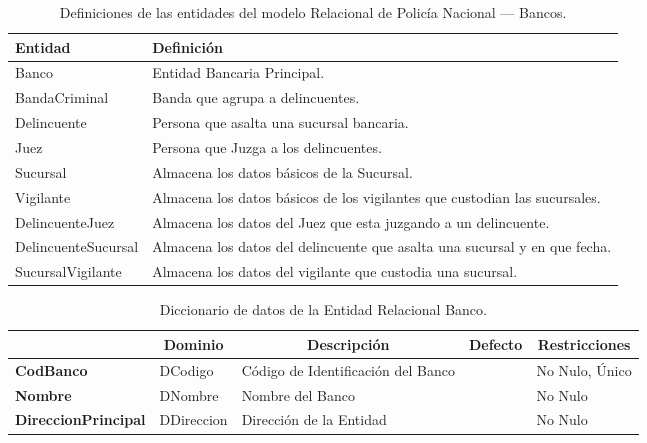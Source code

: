 \begin{table}[H]
\centering
\caption{Definiciones de las entidades del modelo Relacional de Policía Nacional --- Bancos.}
\renewcommand{\arraystretch}{1.5}%
\label{tab-DiccR-2a}
\begin{tabular}{@{}ll@{}}
\toprule
\textbf{Entidad}  & \textbf{Definición}\\ \midrule
Banco    & Entidad Bancaria Principal. \\
BandaCriminal  & Banda que agrupa a delincuentes.\\
Delincuente & Persona que asalta una sucursal bancaria.\\
Juez & Persona que Juzga a los delincuentes.\\
Sucursal & Almacena los datos básicos de la Sucursal.\\
Vigilante & Almacena los datos básicos de los vigilantes que custodian las sucursales.\\
DelincuenteJuez & Almacena los datos del Juez que esta juzgando a un delincuente.\\
DelincuenteSucursal & Almacena los datos del delincuente que asalta una sucursal y en que fecha.\\
SucursalVigilante & Almacena los datos del vigilante que custodia una sucursal.\\

\bottomrule
\end{tabular}
\end{table}

\begin{table}[H]
\centering
\caption{Diccionario de datos de la Entidad Relacional Banco.}
\label{tab-DiccR-2b}
\begin{tabular}{>{\bfseries}m{4.0cm}>{}m{3.0cm}>{}m{6.0cm}>{}m{5.0cm}>{}m{2.0cm}}
\toprule
\multicolumn{1}{c}{\textbf{Atributo}} & \multicolumn{1}{c}{\textbf{Dominio}} & \multicolumn{1}{c}{\textbf{Descripción}} & \multicolumn{1}{c}{\textbf{Defecto}} & \multicolumn{1}{c}{\textbf{Restricciones}} \\ \midrule
CodBanco	        &	DCodigo	    &	Código de Identificación del Banco	&		&	No Nulo, Único\\
Nombre	            &	DNombre	    &	Nombre del Banco	                &		&	No Nulo\\
DireccionPrincipal	&	DDireccion	&	Dirección de la Entidad	            &		&	No Nulo\\
\bottomrule
\end{tabular}
\end{table}


